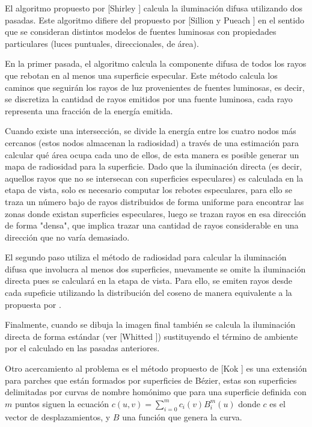 El algoritmo propuesto por [Shirley \cite{Shirley}] calcula la iluminación difusa utilizando dos pasadas. Este algoritmo difiere del propuesto por [Sillion y Pueach \cite{Sillion}] en el sentido que se consideran distintos modelos de fuentes luminosas con propiedades particulares (luces puntuales, direccionales, de área).

En la primer pasada, el algoritmo calcula la componente difusa de todos los rayos que rebotan en al menos una superficie especular. Este método calcula los caminos que seguirán los rayos de luz provenientes de fuentes luminosas, es decir, se discretiza la cantidad de rayos emitidos por una fuente luminosa, cada rayo representa una fracción de la energía emitida.

Cuando existe una intersección, se divide la energía entre los cuatro nodos más cercanos (estos nodos almacenan la radiosidad) a través de una estimación para calcular qué área ocupa cada uno de ellos, de esta manera es posible generar un mapa de radiosidad para la superficie. Dado que la iluminación directa (es decir, aquellos rayos que no se intersecan con superficies especulares) es calculada en la etapa de vista, solo es necesario computar los rebotes especulares, para ello se traza un número bajo de rayos distribuidos de forma uniforme para encontrar las zonas donde existan superficies especulares, luego se trazan rayos en esa dirección de forma "densa", que implica trazar una cantidad de rayos considerable en una dirección que no varía demasiado.

El segundo paso utiliza el método de radiosidad para calcular la iluminación difusa que involucra al menos dos superficies, nuevamente se omite la iluminación directa pues se calculará en la etapa de vista. Para ello, se emiten rayos desde cada supeficie utilizando la distribución del coseno de manera equivalente a la propuesta por \citeauthor{Malley}. 

Finalmente, cuando se dibuja la imagen final también se calcula la iluminación directa de forma estándar (ver [Whitted \cite{Whitted}]) sustituyendo el término de ambiente por el calculado en las pasadas anteriores.

Otro acercamiento al problema es el método propuesto de [Kok \cite{Kok}] es una extensión para parches que están formados por superficies de Bézier, estas son superficies delimitadas por curvas de nombre homónimo que para una superficie definida con $m$ puntos siguen la ecuación $c(u,v) = \sum_{i=0}^{m} c_{i}(v)B_{i}^{m}(u)$ donde $c$ es el vector de desplazamientos, y $B$ una función que genera la curva.


